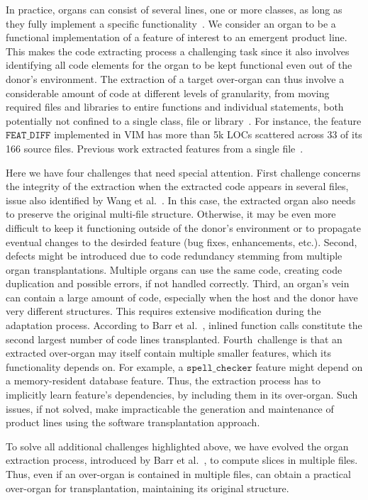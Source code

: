 In practice, organs can consist of several lines, one or more classes, as long as they fully implement a specific functionality~\cite{Wang2018}. We consider an organ to be a functional implementation of a feature of interest to an emergent product line. 
This makes the code extracting process a challenging task since it also involves identifying all code elements for the organ to be kept functional even out of the donor's environment.
The extraction of a target over-organ can thus involve a considerable amount of code at different levels of granularity, from moving required files and libraries to entire functions and individual statements, both potentially not confined to a single class, file or library~\cite{Wang2018}. For instance, the feature $\texttt{FEAT\_DIFF}$ implemented in VIM has more than 5k LOCs scattered across 33 of its 166 source files. 
Previous work extracted features from a single file~\cite{Barr2015}.

Here we have four challenges that need special attention. 
First challenge concerns the integrity of the extraction when the extracted code appears in several files, issue also identified by Wang et al.~\cite{Wang2018}. 
In this case, the extracted organ also needs to preserve the original multi-file structure. 
Otherwise, it may be even more difficult to keep it functioning outside of  the donor's environment or to propagate eventual changes to the desirded feature (bug fixes, enhancements, etc.).
Second, defects might be introduced due to code redundancy stemming from multiple organ transplantations. 
Multiple organs can use the same code, creating code duplication and possible errors, if not handled correctly.
Third, an organ's vein can contain a large amount of code, especially when the host and the donor have very different structures. 
This requires extensive modification during the adaptation process. 
According to Barr et al.~\cite{Barr2015}, inlined function calls constitute the second largest number of code lines transplanted. 
Fourth challenge is that an extracted over-organ may itself contain multiple smaller features, which its functionality depends on.
For example, a $\texttt{spell\_checker}$ feature might depend on a memory-resident database feature. 
Thus, the extraction process has to implicitly learn feature's dependencies, by including them in its over-organ. 
Such issues, if not solved, make impracticable the generation and maintenance of product lines using the software transplantation approach. 

To solve all additional challenges highlighted above, we have evolved the organ extraction process, introduced by Barr et al.~\cite{Barr2015}, to compute slices in multiple files. 
Thus, even if an over-organ is contained in multiple files, \FOUNDRY can obtain a practical over-organ for transplantation, maintaining its original structure. 

